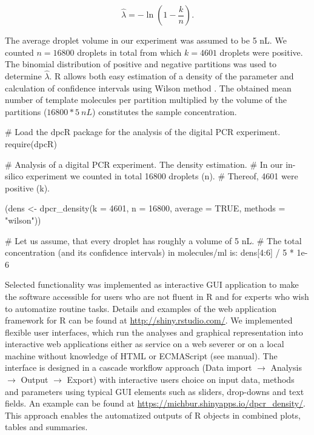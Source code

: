 \begin{equation}
\hat{\lambda} =  -\ln{(1 - \frac{k}{n})}.
\end{equation}

The average droplet volume in our experiment was assumed to be 5 nL. We counted 
$n = 16800$ droplets in total from which $k = 4601$ droplets were positive. The 
binomial distribution of positive and negative partitions was used to determine 
$\hat \lambda$. R allows both easy estimation of a density of the parameter and 
calculation of confidence intervals using Wilson method \citep{brown_2001}. The 
obtained mean number of template molecules per partition multiplied by the 
volume of the partitions ($ 16800 * 5~nL$) constitutes the sample concentration.

\begin{example}
# Load the dpcR package for the analysis of the digital PCR experiment.
require(dpcR)

# Analysis of a digital PCR experiment. The density estimation.
# In our in-silico experiment we counted in total 16800 droplets (n). 
# Thereof, 4601 were positive (k).

(dens <- dpcr_density(k = 4601, n = 16800, average = TRUE, methods = "wilson"))

# Let us assume, that every droplet has roughly a volume of 5 nL.
# The total concentration (and its confidence intervals) in molecules/ml is:
dens[4:6] / 5 * 1e-6
\end{example}

Selected functionality was implemented as interactive  GUI 
application to make the software accessible for users who are not fluent in R 
and for experts who wish to automatize routine tasks. Details and examples of 
the  web application framework for R can be found at 
\url{http://shiny.rstudio.com/}. We implemented 
flexible user interfaces, which run the analyses and graphical representation 
into interactive web applications either as service on a web severer or on a 
local machine without knowledge of HTML or ECMAScript (see  
manual). The interface is designed in a cascade workflow approach (Data import 
$\rightarrow$ Analysis $\rightarrow$ Output $\rightarrow$ Export) with 
interactive users choice on input data, methods and parameters using typical 
GUI 
elements such as sliders, drop-downs and text fields. An example can be found 
at 
\url{https://michbur.shinyapps.io/dpcr_density/}. This approach enables the 
automatized outputs of R objects in combined plots, tables and summaries.

